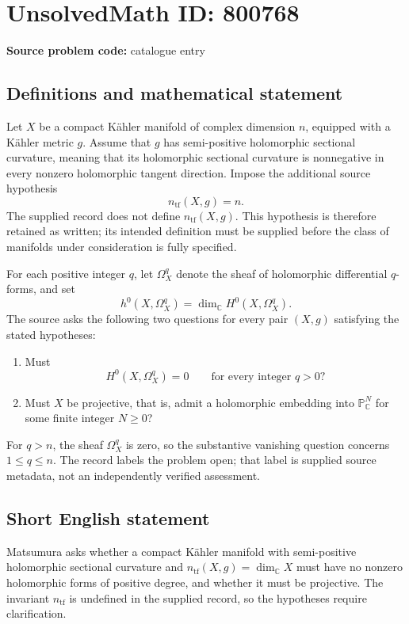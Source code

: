\documentclass[11pt]{article}
\newcommand{\C}{\mathbb{C}}
\newcommand{\PP}{\mathbb{P}}
\begin{document}
\section*{UnsolvedMath ID: 800768}
\textbf{Source problem code:} catalogue entry
\subsection{Definitions and mathematical statement}
Let \(X\) be a compact K\"ahler manifold of complex dimension \(n\), equipped with a K\"ahler metric \(g\). Assume that \(g\) has semi-positive holomorphic sectional curvature, meaning that its holomorphic sectional curvature is nonnegative in every nonzero holomorphic tangent direction. Impose the additional source hypothesis
\[
n_{\mathrm{tf}}(X,g)=n.
\]
The supplied record does not define \(n_{\mathrm{tf}}(X,g)\). This hypothesis is therefore retained as written; its intended definition must be supplied before the class of manifolds under consideration is fully specified.

For each positive integer \(q\), let \(\Omega_X^q\) denote the sheaf of holomorphic differential \(q\)-forms, and set
\[
h^0(X,\Omega_X^q)=\dim_{\C}H^0(X,\Omega_X^q).
\]
The source asks the following two questions for every pair \((X,g)\) satisfying the stated hypotheses:
\begin{enumerate}
\item Must
\[
H^0(X,\Omega_X^q)=0
\qquad\text{for every integer }q>0?
\]
\item Must \(X\) be projective, that is, admit a holomorphic embedding into \(\PP^N_{\C}\) for some finite integer \(N\geq 0\)?
\end{enumerate}
For \(q>n\), the sheaf \(\Omega_X^q\) is zero, so the substantive vanishing question concerns \(1\leq q\leq n\). The record labels the problem open; that label is supplied source metadata, not an independently verified assessment.
\subsection{Short English statement}
Matsumura asks whether a compact K\"ahler manifold with semi-positive holomorphic sectional curvature and \(n_{\mathrm{tf}}(X,g)=\dim_{\C}X\) must have no nonzero holomorphic forms of positive degree, and whether it must be projective. The invariant \(n_{\mathrm{tf}}\) is undefined in the supplied record, so the hypotheses require clarification.
\end{document}
